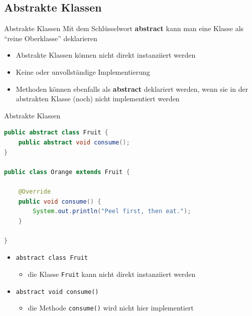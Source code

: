 \documentclass[18pt]{beamer}
\newcommand{\quotes}[1]{``#1''}
\begin{document}
\subsection{Abstrakte Klassen}

\begin{frame}{Abstrakte Klassen}
    Mit dem Schlüsselwort \textbf{abstract} kann man eine Klasse als \quotes{reine Oberklasse} deklarieren

    \begin{itemize}
        \item Abstrakte Klassen können nicht direkt instanziiert werden
        \item Keine oder unvollständige Implementierung
        \item Methoden können ebenfalls als \textbf{abstract} deklariert werden, wenn sie in der abstrakten Klasse (noch) nicht implementiert werden
    \end{itemize}
\end{frame}

\begin{frame}[fragile]{Abstrakte Klassen}
    \begin{exampleblock}{}
        \begin{lstlisting}[language=Java,basicstyle=\scriptsize]
public abstract class Fruit {
    public abstract void consume();
}

public class Orange extends Fruit {

    @Override
    public void consume() {
        System.out.println("Peel first, then eat.");
    }

}
        \end{lstlisting}

    \end{exampleblock}

    \begin{itemize}
        \item \texttt{abstract class Fruit}
        \begin{itemize}
            \item die Klasse \texttt{Fruit} kann nicht direkt instanziiert werden
        \end{itemize}
        \item \texttt{abstract void consume()}
        \begin{itemize}
            \item die Methode \texttt{consume()} wird nicht hier implementiert
        \end{itemize}
    \end{itemize}

\end{frame}
\end{document}
